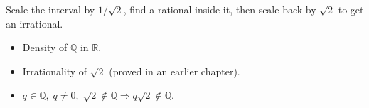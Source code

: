 \begin{remark*}
Scale the interval by $1/\sqrt{2}$, find a rational inside it, then scale back by $\sqrt{2}$ to get an irrational.
\end{remark*}

\begin{remark*}[Dependencies]
\begin{itemize}
  \item Density of $\mathbb{Q}$ in $\mathbb{R}$.
  \item Irrationality of $\sqrt{2}$ (proved in an earlier chapter).
  \item $q \in \mathbb{Q},\; q \ne 0,\; \sqrt{2} \notin \mathbb{Q} \Rightarrow q\sqrt{2} \notin \mathbb{Q}$.
\end{itemize}
\end{remark*}
